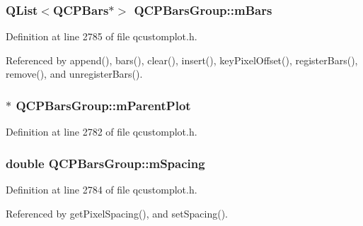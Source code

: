 \subsubsection[{m\+Bars}]{\setlength{\rightskip}{0pt plus 5cm}Q\+List$<${\bf Q\+C\+P\+Bars}$\ast$$>$ Q\+C\+P\+Bars\+Group\+::m\+Bars\hspace{0.3cm}{\ttfamily [protected]}}\label{class_q_c_p_bars_group_affdb1e9233c277ff5a4c0a1121cf1fc0}


Definition at line 2785 of file qcustomplot.\+h.



Referenced by append(), bars(), clear(), insert(), key\+Pixel\+Offset(), register\+Bars(), remove(), and unregister\+Bars().

\hypertarget{class_q_c_p_bars_group_a973d408cfbf88db95115aec71877f9e7}{}
\subsubsection[{m\+Parent\+Plot}]{$\ast$ Q\+C\+P\+Bars\+Group\+::m\+Parent\+Plot\hspace{0.3cm}{\ttfamily [protected]}}\label{class_q_c_p_bars_group_a973d408cfbf88db95115aec71877f9e7}


Definition at line 2782 of file qcustomplot.\+h.

\hypertarget{class_q_c_p_bars_group_a56471d7f548ca6141b7a5bf9629f7ece}{}
\subsubsection[{m\+Spacing}]{\setlength{\rightskip}{0pt plus 5cm}double Q\+C\+P\+Bars\+Group\+::m\+Spacing\hspace{0.3cm}{\ttfamily [protected]}}\label{class_q_c_p_bars_group_a56471d7f548ca6141b7a5bf9629f7ece}


Definition at line 2784 of file qcustomplot.\+h.



Referenced by get\+Pixel\+Spacing(), and set\+Spacing().

\hypertarget{class_q_c_p_bars_group_a6794ee1a9c81864d627bff6a4b2d64ec}{}
